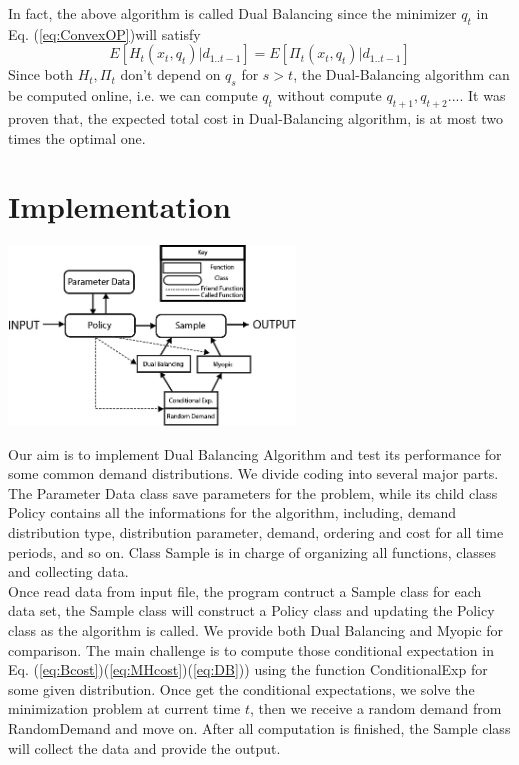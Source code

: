 \documentclass[twoside]{article}
\begin{document}
\begin{multicols}{2}
    In fact, the above algorithm is called Dual Balancing since the minimizer $q_t$ in Eq. (\ref{eq:ConvexOP})will satisfy
    \begin{equation}\label{eq:DB}
        E[H_t(x_t,q_t)| d_{1..t-1}] = E[\Pi_t(x_t,q_t)| d_{1..t-1}]
        \end{equation}
      Since both $H_t,\Pi_t$ don't depend on $q_s$ for $s>t$, the Dual-Balancing algorithm can be computed online, i.e. we can compute $q_t$ without compute $q_{t+1}, q_{t+2} ... $. It was proven that, the expected total cost in Dual-Balancing algorithm,  is at most two times the optimal one\cite{CLAcha2}.


\section{Implementation}


\begin{center}
  \includegraphics[width=3.0in]{software_diagram.png}
\end{center}
Our aim is to implement Dual Balancing Algorithm and test its performance for some common demand distributions. We divide coding into several major parts. The Parameter Data class save parameters for the problem, while its child class Policy contains all the informations for the algorithm, including, demand distribution type, distribution parameter, demand, ordering and cost for all time periods, and so on. Class Sample is in charge of organizing all functions, classes and collecting data.\\
Once read data from input file, the program contruct a Sample class for each data set, the Sample class will construct a Policy class and updating the Policy class as the algorithm is called. We provide both Dual Balancing and Myopic for comparison. The main challenge is to compute those conditional expectation in Eq. (\ref{eq:Bcost})(\ref{eq:MHcost})(\ref{eq:DB})) using the function ConditionalExp for some given distribution. Once get the conditional expectations, we solve the minimization problem at current time $t$, then we receive a random demand from RandomDemand and move on. After all computation is finished, the Sample class will collect the data and provide the output.




\end{multicols}
\end{document}
